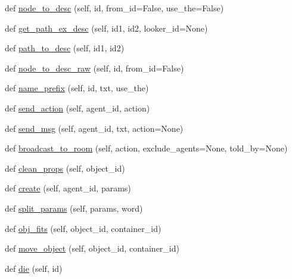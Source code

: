 \begin{DoxyCompactItemize}
\item 
def \hyperlink{classlight__chats_1_1graph_1_1Graph_a9ed5168f4d2a93b6a9f3f3ddd07660d4}{node\+\_\+to\+\_\+desc} (self, id, from\+\_\+id=False, use\+\_\+the=False)
\item 
def \hyperlink{classlight__chats_1_1graph_1_1Graph_adf4ddcd30a97e5d02bc23f5c0a09c8bb}{get\+\_\+path\+\_\+ex\+\_\+desc} (self, id1, id2, looker\+\_\+id=None)
\item 
def \hyperlink{classlight__chats_1_1graph_1_1Graph_afd47e9b4f058dc2cbb520164db920664}{path\+\_\+to\+\_\+desc} (self, id1, id2)
\item 
def \hyperlink{classlight__chats_1_1graph_1_1Graph_ae0b96f3393dd176f10c3f154649cdf25}{node\+\_\+to\+\_\+desc\+\_\+raw} (self, id, from\+\_\+id=False)
\item 
def \hyperlink{classlight__chats_1_1graph_1_1Graph_a2da14e9a8a4c547fea59eee63dd9f70c}{name\+\_\+prefix} (self, id, txt, use\+\_\+the)
\item 
def \hyperlink{classlight__chats_1_1graph_1_1Graph_a783ebf83adeed30c0ba89679f535d33c}{send\+\_\+action} (self, agent\+\_\+id, action)
\item 
def \hyperlink{classlight__chats_1_1graph_1_1Graph_a966d3719771ddc58c520f0821c18d959}{send\+\_\+msg} (self, agent\+\_\+id, txt, action=None)
\item 
def \hyperlink{classlight__chats_1_1graph_1_1Graph_ae53a707683cac4ddbafbefb0e0130bfa}{broadcast\+\_\+to\+\_\+room} (self, action, exclude\+\_\+agents=None, told\+\_\+by=None)
\item 
def \hyperlink{classlight__chats_1_1graph_1_1Graph_aa28ea4b9a270d74783f277f04170d669}{clean\+\_\+props} (self, object\+\_\+id)
\item 
def \hyperlink{classlight__chats_1_1graph_1_1Graph_acc495d94797d39558b1711d0bbf6346d}{create} (self, agent\+\_\+id, params)
\item 
def \hyperlink{classlight__chats_1_1graph_1_1Graph_a3d44dae0701925da960433cb98229c21}{split\+\_\+params} (self, params, word)
\item 
def \hyperlink{classlight__chats_1_1graph_1_1Graph_af7460b9c8069563289b8b6b11f831b63}{obj\+\_\+fits} (self, object\+\_\+id, container\+\_\+id)
\item 
def \hyperlink{classlight__chats_1_1graph_1_1Graph_a8a92252320777766ddab522549671f43}{move\+\_\+object} (self, object\+\_\+id, container\+\_\+id)
\item 
def \hyperlink{classlight__chats_1_1graph_1_1Graph_a74bc5374a9c9f411008e726fac4cd7f1}{die} (self, id)

\end{DoxyCompactItemize}
